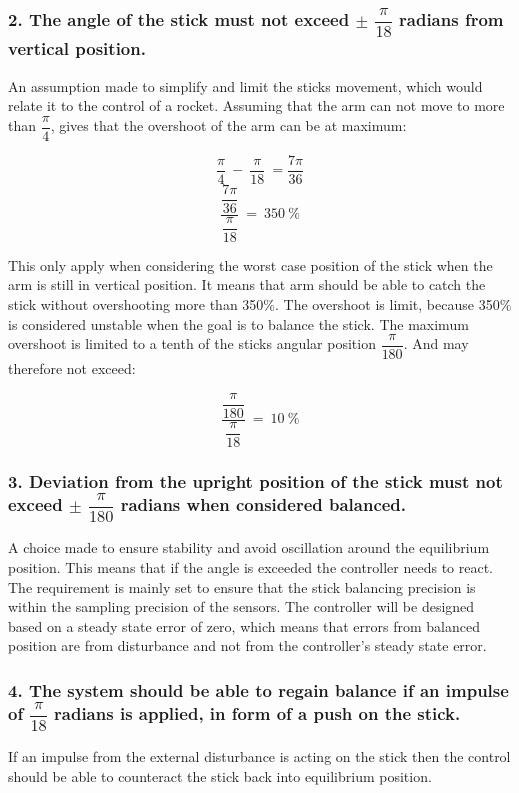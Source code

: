 \subsubsection*{2. The angle of the stick must not exceed $\pm$ $\dfrac{\pi}{18}$ radians from vertical position.}
\forceindent An assumption made to simplify and limit the sticks movement, which would relate it to the control of a rocket. Assuming that the arm can not move to more than $\dfrac{\pi}{4}$, gives that the overshoot of the arm can be at maximum:


\begin{equation}
\dfrac{\pi}{4}\ -\ \dfrac{\pi}{18}\ = \dfrac{7\pi}{36}
\end{equation}
\begin{equation}
\frac{\dfrac{7\pi}{36}}{\dfrac{\pi}{18}}\ =\ 350\ \% 
\end{equation}

This only apply when considering the worst case position of the stick when the arm is still in vertical position. It means that arm should be able to catch the stick without overshooting more than 350\%. The overshoot is limit, because 350\% is considered unstable when the goal is to balance the stick. The maximum overshoot is limited to a tenth of the sticks angular position $\dfrac{\pi}{180}$. And may therefore not exceed:

\begin{equation}
\frac{\dfrac{\pi}{180}}{\dfrac{\pi}{18}}\ =\ 10\ \% 
\end{equation}


\subsubsection*{3. Deviation from the upright position of the stick must not exceed $\pm$ $\dfrac{\pi}{180}$ radians when considered balanced.}
\forceindent A choice made to ensure stability and avoid oscillation around the equilibrium position.
This means that if the angle is exceeded the controller needs to react. The requirement is mainly set to ensure that the stick balancing precision is within the sampling precision of the sensors. The controller will be designed based on a steady state error of zero, which means that errors from balanced position are from disturbance and not from the controller's steady state error.

\subsubsection*{4. The system should be able to regain balance if an impulse of $\dfrac{\pi}{18}$ radians is applied, in form of a push on the stick.} 
\forceindent If an impulse from the external disturbance is acting on the stick then the control should be able to counteract the stick back into equilibrium position.   



